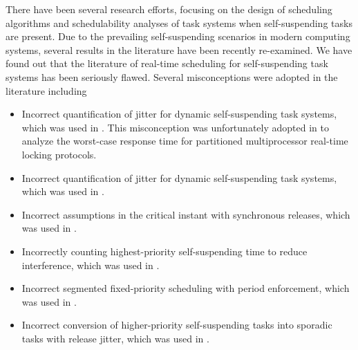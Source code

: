 There have been several research efforts, focusing on the design of scheduling algorithms and schedulability analyses of task systems when self-suspending tasks are present. Due to the prevailing self-suspending scenarios in modern computing systems, several results in the literature have been recently re-examined. We have found out that the literature of real-time scheduling for self-suspending task systems has been seriously flawed. Several misconceptions were adopted in the literature including 
\begin{itemize}
\item Incorrect quantification of jitter for dynamic self-suspending
  task systems, which was used in
  \cite{ECRTS-AudsleyB04,RTAS-AudsleyB04,RTCSA-KimCPKH95,MingLiRTCSA1994}.  This
  misconception was unfortunately adopted in \cite{zeng-2011,bbb-2013,yang-2013,kim-2014,han-2014,carminati-2014,yang-2014,lakshmanan-2009} to analyze the worst-case response time for
  partitioned multiprocessor real-time locking protocols.
\item Incorrect quantification of jitter for dynamic self-suspending
  task systems, which was used in  \cite{RTCSA-BletsasA05}.
\item Incorrect assumptions in the critical instant with
  synchronous releases, which was used in \cite{LR:rtas10}.
\item Incorrectly counting highest-priority self-suspending time to reduce
  interference, which was used in  \cite{RTSS-KimANR13}. 
\item Incorrect segmented fixed-priority scheduling with period
  enforcement, which was used in \cite{RTSS-KimANR13,DBLP:journals/ieicet/DingTT09}.
\item Incorrect conversion of higher-priority self-suspending tasks into sporadic tasks with release jitter, which was used in \cite{ecrts15nelissen}.
\end{itemize}


